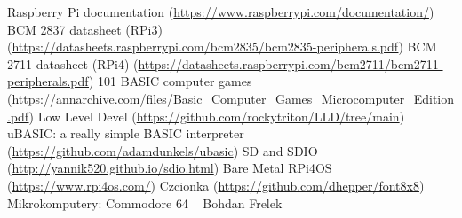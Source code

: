 \documentclass[shortabstract]{iithesis}
\begin{document}
\begin{thebibliography}{1}

\bibitem{} Raspberry Pi documentation (\url{https://www.raspberrypi.com/documentation/})
\bibitem{} BCM 2837 datasheet (RPi3) (\url{https://datasheets.raspberrypi.com/bcm2835/bcm2835-peripherals.pdf})
\bibitem{} BCM 2711 datasheet (RPi4) (\url{https://datasheets.raspberrypi.com/bcm2711/bcm2711-peripherals.pdf})
\bibitem{} 101 BASIC computer games (\url{https://annarchive.com/files/Basic_Computer_Games_Microcomputer_Edition.pdf})
\bibitem{} Low Level Devel (\url{https://github.com/rockytriton/LLD/tree/main})
\bibitem{} uBASIC: a really simple BASIC interpreter (\url{https://github.com/adamdunkels/ubasic})
\bibitem{} SD and SDIO (\url{http://yannik520.github.io/sdio.html})
\bibitem{} Bare Metal RPi4OS (\url{https://www.rpi4os.com/})
\bibitem{} Czcionka (\url{https://github.com/dhepper/font8x8})
\bibitem{} Mikrokomputery: Commodore 64 ~ Bohdan Frelek

\end{thebibliography}
\end{document}
